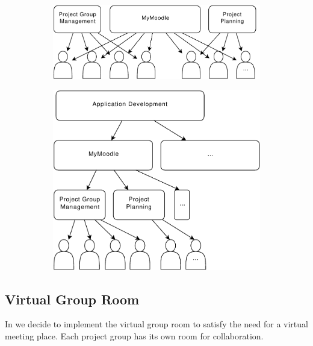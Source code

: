 \begin{figure}%
        \begin{subfigure}[b]{0.45\textwidth}
                \centering
                \includegraphics[width=\textwidth]{images/FlatGroupStructure.pdf}
                \label{fig:groupstructure:flat}
        \end{subfigure}%
				\quad
        \begin{subfigure}[b]{0.45\textwidth}
                \centering
                \includegraphics[width=\textwidth]{images/RecursiveTreeStructure.pdf}
                \label{fig:groupstructure:rec}
        \end{subfigure}%
%
\label{fig:groupstructure}%
\end{figure}



\subsection{Virtual Group Room}
In  we decide to implement the virtual group room to satisfy the need for a virtual meeting place.
Each project group has its own room for collaboration. 

